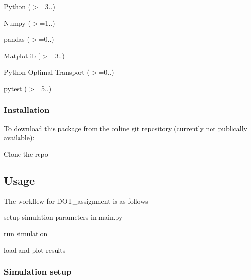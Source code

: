 \begin{DoxyItemize}
\item Python ($>$=3..)
\item Numpy ($>$=1..)
\item pandas ($>$=0..)
\item Matplotlib ($>$=3..)
\item Python Optimal Transport ($>$=0..) 
\begin{DoxyCode}{0}
\end{DoxyCode}

\item pytest ($>$=5..) 
\begin{DoxyCode}{0}
\end{DoxyCode}

\end{DoxyItemize}

\subsubsection*{Installation}

To download this package from the online git repository (currently not publically available)\+:


\begin{DoxyEnumerate}
\item Clone the repo 
\begin{DoxyCode}{0}
\end{DoxyCode}

\end{DoxyEnumerate}

\subsection*{Usage}

The workflow for D\+O\+T\+\_\+assignment is as follows
\begin{DoxyEnumerate}
\item setup simulation parameters in main.\+py
\item run simulation
\item load and plot results
\end{DoxyEnumerate}

\subsubsection*{Simulation setup}

